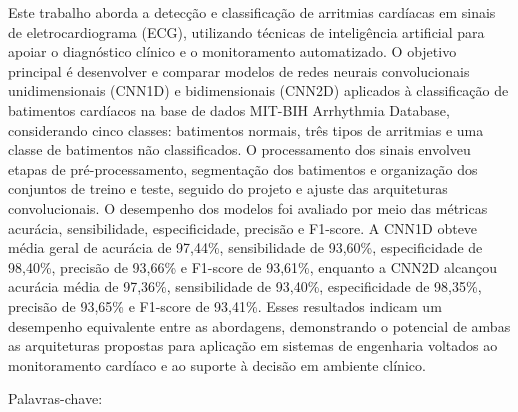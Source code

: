 \begin{resumo}
  \vspace{-15pt}
  
  Este trabalho aborda a detecção e classificação de arritmias cardíacas em sinais de eletrocardiograma (ECG), utilizando técnicas de inteligência 
  artificial para apoiar o diagnóstico clínico e o monitoramento automatizado. O objetivo principal é desenvolver e comparar modelos de redes 
  neurais convolucionais unidimensionais (CNN1D) e bidimensionais (CNN2D) aplicados à classificação de batimentos cardíacos na base de dados 
  MIT-BIH Arrhythmia Database, considerando cinco classes: batimentos normais, três tipos de arritmias e uma classe de batimentos não classificados. 
  O processamento dos sinais envolveu etapas de pré-processamento, segmentação dos batimentos e organização dos conjuntos de treino e teste, 
  seguido do projeto e ajuste das arquiteturas convolucionais. O desempenho dos modelos foi avaliado por meio das métricas acurácia, sensibilidade, 
  especificidade, precisão e F1-score. A CNN1D obteve média geral de acurácia de 97,44\%, sensibilidade de 93,60\%, especificidade de 98,40\%, 
  precisão de 93,66\% e F1-score de 93,61\%, enquanto a CNN2D alcançou acurácia média de 97,36\%, sensibilidade de 93,40\%, especificidade de 98,35\%, 
  precisão de 93,65\% e F1-score de 93,41\%. Esses resultados indicam um desempenho equivalente entre as abordagens, demonstrando o potencial de 
  ambas as arquiteturas propostas para aplicação em sistemas de engenharia voltados ao monitoramento cardíaco e ao suporte à decisão em ambiente 
  clínico.

  Palavras-chave: \palavraschaveemlinha
\end{resumo}


